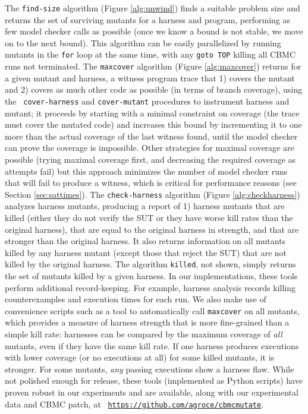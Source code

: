 \documentclass{svjour3}
\begin{document}
The {\tt find-size} algorithm (Figure \ref{alg:unwind}) finds a
suitable problem size and returns the set of surviving mutants for a
harness and program, performing as few model checker calls as possible
(once we know a bound is not stable, we move on to the next bound).
This algorithm can be easily parallelized by running mutants in the
{\tt for} loop at the same time, with any {\tt goto TOP} killing all
CBMC runs not terminated.  The {\tt maxcover} algorithm (Figure
\ref{alg:maxcover}) returns for a given mutant and harness, a witness
program trace that 1) covers the mutant and 2) covers as much other
code as possible (in terms of branch coverage), using the {\tt
  cover-harness} and {\tt cover-mutant} procedures to instrument
harness and mutant; it proceeds by starting with a minimal constraint
on coverage (the trace must cover the mutated code) and increases this
bound by incrementing it to one more than the actual coverage of the
last witness found, until the model checker can prove the coverage is
impossible.  Other strategies for maximal coverage are possible
(trying maximal coverage first, and decreasing the required coverage
as attempts fail) but this approach minimizes the number of model
checker runs that will fail to produce a witness, which is critical
for performance reasons (see Section \ref{sec:sattimes}).  The 
{\tt check-harness} algorithm (Figure \ref{alg:checkharness}) analyzes
harness mutants, producing a report of 1) harness mutants that are
killed (either they do not verify the SUT or they have worse kill
rates than the original harness), that are equal to the original
harness in strength, and that are stronger than the original harness.
It also returns information on all mutants killed by any harness
mutant (except those that reject the SUT) that are not killed by the
original harness.  The algorithm {\tt killed}, not shown, simply
returns the set of mutants killed by a given harness.  In our
implementations, these tools perform additional record-keeping. For
example, harness analysis records killing counterexamples and
execution times for each run.  We also make use of convenience scripts
such as a tool to automatically call {\tt maxcover} on all mutants,
which provides a measure of harness strength that is more fine-grained
than a simple kill rate: harnesses can be compared by the maximum
coverage of \emph{all} mutants, even if they have the same kill rate.
If one harness produces executions with lower coverage (or no
executions at all) for some killed mutants, it is stronger.  For some
mutants, \emph{any} passing executions show a harness flaw. While not
polished enough for release, these tools (implemented as Python
scripts) have proven robust in our experiments and are available,
along with our experimental data and CBMC patch, at {\tt
  \url{https://github.com/agroce/cbmcmutate}}.
\end{document}
